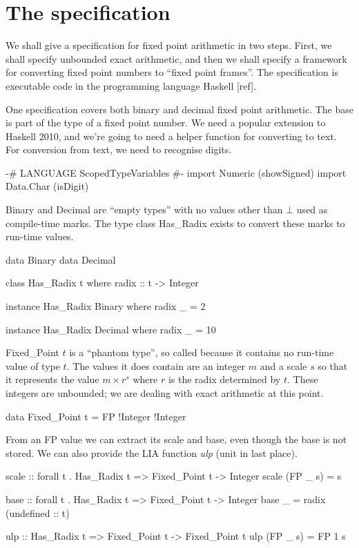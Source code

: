 \documentclass{article}
\begin{document}
\section{The specification}

We shall give a specification for fixed point arithmetic in two
steps.  First, we shall specify unbounded exact arithmetic, and
then we shall specify a framework for converting fixed point
numbers to ``fixed point frames''.  The specification is executable
code in the programming language Haskell [ref].

One specification covers both binary and decimal fixed point
arithmetic.  The base is part of the type of a fixed point number.
We need a popular extension to Haskell 2010, and we're going to
need a helper function for converting to text.  For conversion
from text, we need to recognise digits.
\begin{code}
{-# LANGUAGE ScopedTypeVariables #-}
import Numeric (showSigned)
import Data.Char (isDigit)
\end{code}
Binary and Decimal are ``empty types'' with no values other
than $\bot$ used as compile-time marks.  The type class
Has\_Radix exists to convert these marks to run-time values.
\begin{code}
data Binary
data Decimal

class Has_Radix t
  where radix :: t -> Integer

instance Has_Radix Binary
  where radix _ = 2

instance Has_Radix Decimal
  where radix _ = 10
\end{code}

Fixed\_Point $t$ is a ``phantom type'', so called because it
contains no run-time value of type $t$.  The values it does
contain are an integer $m$ and a scale $s$ so that it represents
the value $m\times r^s$ where $r$ is the radix determined by $t$.
These integers are unbounded; we are dealing with exact arithmetic
at this point.
\begin{code}
data Fixed_Point t = FP !Integer !Integer
\end{code}

From an FP value we can extract its scale and base, even though
the base is not stored.  We can also provide the LIA function
{\it ulp} (unit in last place).

\begin{code}
scale :: forall t . Has_Radix t => Fixed_Point t -> Integer
scale (FP _ s) = s

base :: forall t . Has_Radix t => Fixed_Point t -> Integer
base _ = radix (undefined :: t)

ulp :: Has_Radix t => Fixed_Point t -> Fixed_Point t
ulp (FP _ s) = FP 1 s
\end{code}
\end{document}
